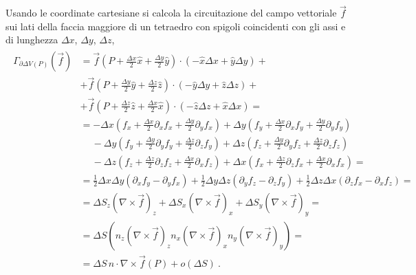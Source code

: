 \documentclass[letterpaper,10pt,italian]{jupyterBook}
\begin{document}
\sphinxAtStartPar
Usando le coordinate cartesiane si calcola la circuitazione del campo vettoriale \(\vec{f}\) sui lati della faccia maggiore di un tetraedro con spigoli coincidenti con gli assi e di lunghezza \(\Delta x\), \(\Delta y\), \(\Delta z\),
\begin{equation*}
\begin{split}\begin{aligned}
  \Gamma_{\partial \Delta V(P)}\left(\vec{f}\right) 
  & = \vec{f}\left( P + \frac{\Delta x}{2} \hat{x} + \frac{\Delta y}{2} \hat{y} \right) \cdot \left( - \hat{x} \Delta x + \hat{y} \Delta y \right) + \\
  & + \vec{f}\left( P + \frac{\Delta y}{2} \hat{y} + \frac{\Delta z}{2} \hat{z} \right) \cdot \left( - \hat{y} \Delta y + \hat{z} \Delta z \right) + \\
  & + \vec{f}\left( P + \frac{\Delta z}{2} \hat{z} + \frac{\Delta x}{2} \hat{x} \right) \cdot \left( - \hat{z} \Delta z + \hat{x} \Delta x \right) = \\
  & =       - \Delta x \left( f_x + \frac{\Delta x}{2} \partial_x f_x + \frac{\Delta y}{2} \partial_y f_x \right)
            + \Delta y \left( f_y + \frac{\Delta x}{2} \partial_x f_y + \frac{\Delta y}{2} \partial_y f_y \right) \\
  & \ \quad - \Delta y \left( f_y + \frac{\Delta y}{2} \partial_y f_y + \frac{\Delta z}{2} \partial_z f_y \right)
            + \Delta z \left( f_z + \frac{\Delta y}{2} \partial_y f_z + \frac{\Delta z}{2} \partial_z f_z \right) \\
  & \ \quad - \Delta z \left( f_z + \frac{\Delta z}{2} \partial_z f_z + \frac{\Delta x}{2} \partial_x f_z \right)
            + \Delta x \left( f_x + \frac{\Delta z}{2} \partial_z f_x + \frac{\Delta x}{2} \partial_x f_x \right) = \\
  & = \frac{1}{2} \Delta x \Delta y \left( \partial_x f_y - \partial_y f_x \right)
    + \frac{1}{2} \Delta y \Delta z \left( \partial_y f_z - \partial_z f_y \right)
    + \frac{1}{2} \Delta z \Delta x \left( \partial_z f_x - \partial_x f_z \right) = \\
  & = \Delta S_z \left( \nabla \times \vec{f} \right)_z
    + \Delta S_x \left( \nabla \times \vec{f} \right)_x
    + \Delta S_y \left( \nabla \times \vec{f} \right)_y = \\
  & = \Delta S \left(
             n_z \left( \nabla \times \vec{f} \right)_z
             n_x \left( \nabla \times \vec{f} \right)_x
             n_y \left( \nabla \times \vec{f} \right)_y 
  \right) = \\
  & = \Delta S \, \hat{n} \cdot \nabla \times \vec{f}(P) + o(\Delta S) \ .
\end{aligned}\end{split}
\end{equation*}
\sphinxstepscope
\end{document}

